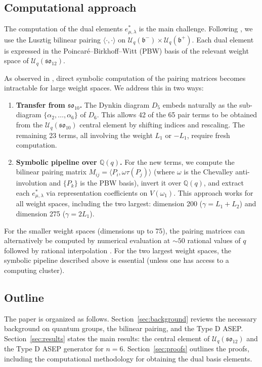 \documentclass{ximera}
\newcommand{\so}{\mathfrak{so}}
\newcommand{\Uq}{\mathcal{U}_q}
\begin{document}
\subsection{Computational approach}

The computation of the dual elements $e^*_{\mu,\lambda}$ is the main challenge. Following \cite{Kuan_2016, kuan2020}, we use the Lusztig bilinear pairing $\langle \cdot, \cdot \rangle$ on $\Uq(\mathfrak{b}^-) \times \Uq(\mathfrak{b}^+)$. Each dual element is expressed in the Poincar\'{e}--Birkhoff--Witt (PBW) basis of the relevant weight space of $\Uq(\so_{12})$.

As observed in \cite{RohrSellakumaranYin}, direct symbolic computation of the pairing matrices becomes intractable for large weight spaces. We address this in two ways:
\begin{enumerate}
    \item  \textbf{Transfer from $\so_{10}$.} The Dynkin diagram $D_5$ embeds naturally as the sub-diagram $\{\alpha_2, \ldots, \alpha_6\}$ of $D_6$. This allows 42 of the 65 pair terms to be obtained from the $\Uq(\so_{10})$ central element by shifting indices and rescaling. The remaining 23 terms, all involving the weight $L_1$ or $-L_1$, require fresh computation.
    \item \textbf{Symbolic pipeline over $\mathbb{Q}(q)$.} For the new terms, we compute the bilinear pairing matrix $M_{ij} = \langle P_i, \omega\tau(P_j) \rangle$ (where $\omega$ is the Chevalley anti-involution and $\{P_k\}$ is the PBW basis), invert it over $\mathbb{Q}(q)$, and extract each $e^*_{\mu,\lambda}$ via representation coefficients on $V(\omega_1)$. This approach works for all weight spaces, including the two largest: dimension 200 ($\gamma = L_1 + L_2$) and dimension 275 ($\gamma = 2L_1$).
\end{enumerate}

For the smaller weight spaces (dimensions up to 75), the pairing matrices can alternatively be computed by numerical evaluation at $\sim\!50$ rational values of $q$ followed by rational interpolation \cite{RohrSellakumaranYin}. For the two largest weight spaces, the symbolic pipeline described above is essential (unless one has access to a computing cluster).



\subsection{Outline}

The paper is organized as follows. Section~\ref{sec:background} reviews the necessary background on quantum groups, the bilinear pairing, and the Type D ASEP. Section~\ref{sec:results} states the main results: the central element of $\Uq(\so_{12})$ and the Type D ASEP generator for $n = 6$. Section~\ref{sec:proofs} outlines the proofs, including the computational methodology for obtaining the dual basis elements.
\end{document}
